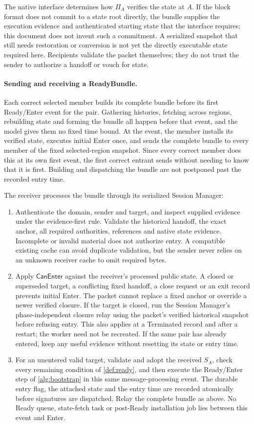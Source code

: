 \documentclass[11pt,a4paper]{article}
\newcommand{\tagg}[1]{\ensuremath{\mathsf{#1}}}
\begin{document}
The native interface determines how $\Pi_A$ verifies the state at $A$.
If the block format does not commit to a state root directly, the bundle
supplies the execution evidence and authenticated starting state that the
interface requires; this document does not invent such a commitment. A
serialized snapshot that still needs restoration or conversion is not yet
the directly executable state required here. Recipients validate the
packet themselves; they do not trust the sender to authorize a handoff or
vouch for state.

\paragraph{Sending and receiving a ReadyBundle.}
Each correct selected member builds its complete bundle before its first
Ready/Enter event for the pair. Gathering histories, fetching across
regions, rebuilding state and forming the bundle all happen before that
event, and the model gives them no fixed time bound. At the event, the
member installs its verified state, executes initial Enter once, and
sends the complete bundle to every member of the fixed selected-region
snapshot. Since every correct member does this at its own first event,
the first correct entrant sends without needing to know that it is first.
Building and dispatching the bundle are not postponed past the recorded
entry time.

The receiver processes the bundle through its serialized Session Manager:
\begin{enumerate}[label=(\roman*),itemsep=2pt]
\item Authenticate the domain, sender and target, and inspect supplied
evidence under the evidence-first rule. Validate the historical handoff,
the exact anchor, all required authorities, references and native state
evidence. Incomplete or invalid material does not authorize entry. A
compatible existing cache can avoid duplicate validation, but the sender
never relies on an unknown receiver cache to omit required bytes.
\item Apply $\tagg{CanEnter}$ against the receiver's processed public
state. A closed or superseded target, a conflicting fixed handoff, a
close request or an exit record prevents initial Enter. The packet cannot
replace a fixed anchor or override a newer verified closure. If the
target is closed, run the Session Manager's phase-independent closure
relay using the packet's verified historical snapshot before refusing
entry. This also applies at a Terminated record and after a restart; the
worker need not be recreated. If the same pair has already entered, keep
any useful evidence without resetting its state or entry time.
\item For an unentered valid target, validate and adopt the received
$S_A$, check every remaining condition of \cref{def:ready}, and then
execute the Ready/Enter step of \cref{alg:bootstrap} in this same
message-processing event. The durable entry flag, the attached state and
the entry time are recorded atomically before signatures are dispatched.
Relay the complete bundle as above. No Ready queue, state-fetch task or
post-Ready installation job lies between this event and Enter.
\end{enumerate}
\end{document}
